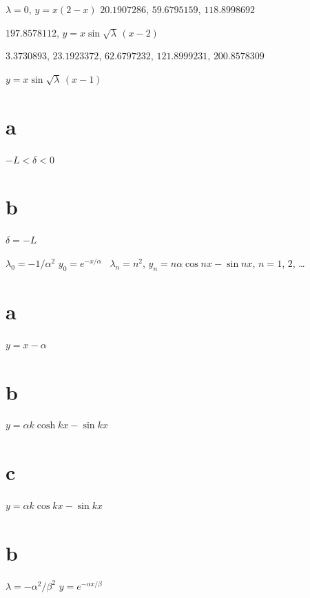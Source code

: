 \smallskip

 $\lambda=0$, $y=x(2-x)$   $20.1907286$, $59.6795159$, $118.8998692$

\quad \quad $197.8578112$, $y=x\sin\sqrt{\lambda}\,(x-2)$

\smallskip

  $3.3730893$, $23.1923372$, $62.6797232$, $121.8999231$,
$200.8578309$

\quad \quad
$y=x\sin\sqrt{\lambda}\,(x-1)$

\smallskip
{} \part{a} $-L<\delta<0$\;   \part{b} $\delta=-L$

 $\lambda_{0}=-1/\alpha^{2}$ $y_{0}=e^{-x/\alpha}$  \,
 $\lambda_{n}=n^{2}$,
$y_{n}=n\alpha\cos nx-\sin nx$,\;   $n=1$, $2$, \dots

\smallskip
{}  \part{a} $y=x-\alpha$ \, \part{b} $y=\alpha k\cosh kx-\sin kx$
\part{c}  $y=\alpha k\cos kx-\sin kx$

\smallskip
{} \part{b} $\lambda=-\alpha^{2}/\beta^{2}$   $y=e^{-\alpha x/\beta}$

